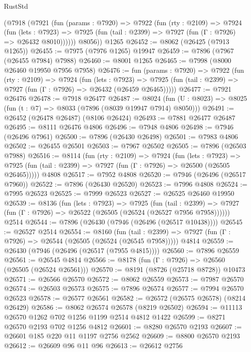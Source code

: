 \begin{lexlean}{RustStd}
\begin{coremodule}
      (@7918
        (@7921
          (fun (params : @7920) =>
          @7922
            (fun (rty : @2109) =>
            @7924
              (fun (lets : @7923) =>
              @7925 (fun (tail : @2399) => @7927 (fun (Γ : @7926) => @26432 @8010))))))
        @8056))
    @1265
@26452 := @8062 (@26425 (@7913 @1265))
@26455 := @7975 (@7976 @1265) @19947
@26459 := @7896 (@7967 (@26455 @7984) @7988)
@26460 := @8001 @1265
@26465 := @7998 (@8000 @26460 @19950 @7956 @7958)
@26476 := fun (params : @7920) =>
  @7922
    (fun (rty : @2109) =>
    @7924
      (fun (lets : @7923) =>
      @7925 (fun (tail : @2399) => @7927 (fun (Γ : @7926) => @26432 (@26459 @26465)))))
@26477 := @7921 @26476
@26478 := @7918 @26477
@26487 := @8024
    (fun (U : @8023) => @8025 (fun (t : @7) => @8033 (@7896 (@8039 @19947 @7914) @8050)))
@26491 := @26452 (@26478 @26487) (@8106 @26424)
@26493 := @7881 @26477 @26487
@26495 := @8111 @26476 @4806
@26496 := @7948 @4806
@26498 := @7946 (@26496 @7961)
@26500 := @7896 (@26430 @26498)
@26501 := @7983 @4806
@26502 := @26455 @26501
@26503 := @7967 @26502
@26505 := @7896 (@26503 @7988)
@26516 := @8114
    (fun (rty : @2109) =>
    @7924
      (fun (lets : @7923) =>
      @7925 (fun (tail : @2399) => @7927 (fun (Γ : @7926) => @26500 (@26505 @26465)))))
    @4808
@26517 := @7952 @4808
@26520 := @7946 (@26496 (@26517 @7960))
@26522 := @7896 (@26430 @26520)
@26523 := @7996 @4808
@26524 := @7995 @26523
@26525 := @7999 @26523
@26527 := @26525 @26460 @19950
@26539 := @8136
    (fun (lets : @7923) =>
    @7925
      (fun (tail : @2399) =>
      @7927 (fun (Γ : @7926) => @26522 (@26505 (@26524 (@26527 @7956 @7958))))))
    @2514
@26544 := @7896 (@26430 (@7946 (@26496 (@26517 @10438))))
@26545 := @26527 @2514
@26554 := @8160
    (fun (tail : @2399) => @7927 (fun (Γ : @7926) => @26544 (@26505 (@26524 (@26545 @7958)))))
    @4814
@26559 := @26430 (@7946 (@26496 (@26517 (@7955 @4815))))
@26560 := @7896 @26559
@26561 := @26545 @4814
@26566 := @8178 (fun (Γ : @7926) => @26560 (@26505 (@26524 @26561)))
@26570 := @8191 (@8726 (@25718 @8728)) @10473
@26571 := @26566 @26570
@26572 := @8062 @26559
@26573 := @7987 @26570
@26574 := @26503 @26573
@26575 := @7896 @26574
@26577 := @7994 @26570 @26523
@26578 := @26577 @26561
@26582 := @26572 (@26575 @26578) (@8214 @26429)
@26586 := @8062 @26574 @26578 (@8219 @26502)
@26594 := @11113 @26570 @1262 @702 @1256 @1199 @2514 @4812 @1422
@26599 := @8271 @26570 @2193 @702 @1256 @4812
@26601 := @8280 @26570 @2193
@26607 := @26601 @185 @220 @11 @1197 @2756 @2562
@26609 := @8800 @26570 @2193
@26612 := @26609 @96 @11 @96
@26613 := @26612 @2756

\end{coremodule}
\end{lexlean}
